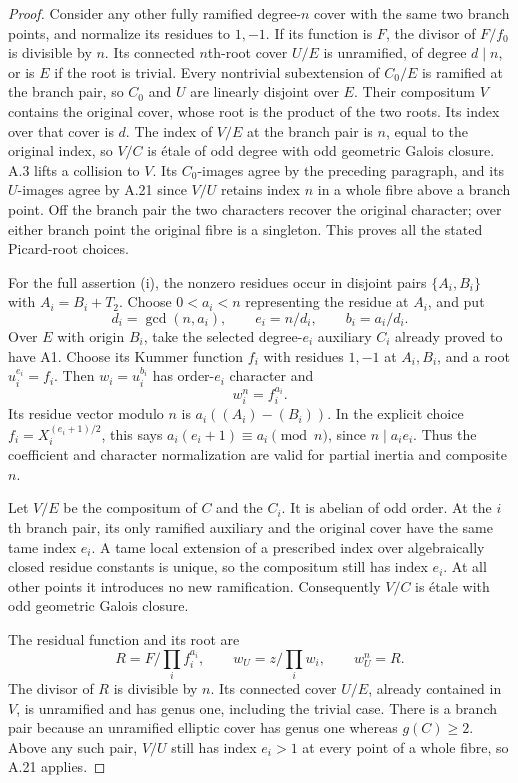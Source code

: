 \begin{proof}
Consider any other fully ramified degree-$n$ cover
with the same two branch points, and normalize its
residues to $1,-1$. If its function is $F$, the
divisor of $F/f_0$ is divisible by $n$. Its connected
$n$th-root cover $U/E$ is unramified, of degree
$d\mid n$, or is $E$ if the root is trivial.
Every nontrivial subextension of $C_0/E$ is ramified
at the branch pair, so $C_0$ and $U$ are linearly
disjoint over $E$. Their compositum $V$ contains
the original cover, whose root is the product of
the two roots. Its index over that cover is $d$.
The index of $V/E$ at the branch pair is $n$, equal
to the original index, so $V/C$ is \'etale of odd
degree with odd geometric Galois closure. A.3 lifts
a collision to $V$. Its $C_0$-images agree by the
preceding paragraph, and its $U$-images agree by
A.21 since $V/U$ retains index $n$ in a whole fibre
above a branch point. Off the branch pair the two
characters recover the original character; over
either branch point the original fibre is a singleton.
This proves all the stated Picard-root choices.

For the full assertion \textup{(i)}, the nonzero
residues occur in disjoint pairs
$\{A_i,B_i\}$ with $A_i=B_i+T_2$.
Choose $0<a_i<n$ representing the residue at $A_i$,
and put
\[
 d_i=\gcd(n,a_i),\qquad e_i=n/d_i,\qquad b_i=a_i/d_i.
\]
Over $E$ with origin $B_i$, take the selected
degree-$e_i$ auxiliary $C_i$ already proved to have
A1. Choose its Kummer function $f_i$ with residues
$1,-1$ at $A_i,B_i$, and a root $u_i^{e_i}=f_i$.
Then $w_i=u_i^{b_i}$ has order-$e_i$ character and
\[
 w_i^n=f_i^{a_i}.                                      \tag{A.55}
\]
Its residue vector modulo $n$ is
$a_i((A_i)-(B_i))$. In the explicit choice
$f_i=X_i^{(e_i+1)/2}$, this says
$a_i(e_i+1)\equiv a_i\pmod n$, since $n\mid a_ie_i$.
Thus the coefficient and character normalization
are valid for partial inertia and composite $n$.

Let $V/E$ be the compositum of $C$ and the $C_i$.
It is abelian of odd order. At the $i$th branch
pair, its only ramified auxiliary and the original
cover have the same tame index $e_i$. A tame local
extension of a prescribed index over algebraically
closed residue constants is unique, so the
compositum still has index $e_i$. At all other
points it introduces no new ramification.
Consequently $V/C$ is \'etale with odd geometric
Galois closure.

The residual function and its root are
\[
 R=F/\prod_i f_i^{a_i},\qquad
 w_U=z/\prod_i w_i,\qquad w_U^n=R.
\]
The divisor of $R$ is divisible by $n$. Its
connected cover $U/E$, already contained in $V$,
is unramified and has genus one, including the
trivial case. There is a branch pair because an
unramified elliptic cover has genus one whereas
$g(C)\ge2$. Above any such pair, $V/U$ still has
index $e_i>1$ at every point of a whole fibre, so
A.21 applies.


\end{proof}
